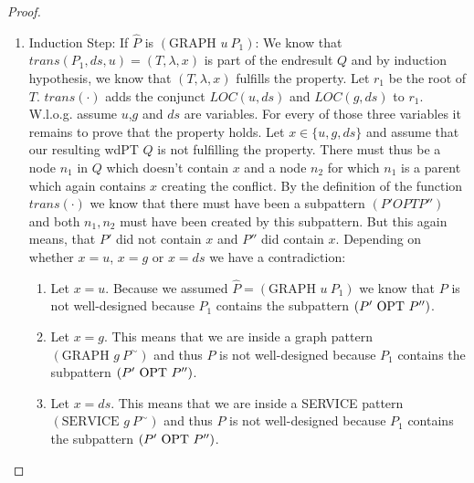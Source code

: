 \begin{proof}
\begin{enumerate}
\begin{enumerate}
				\item Induction Step: If $\hat{P}$ is $(\mbox{GRAPH }  u \ P_1)$:
					We know that $trans(P_1,ds,u) = (T, \lambda,x)$ 
					is part of the endresult $Q$ and by induction hypothesis,
					we know that $(T, \lambda,x)$ fulfills the property. Let
					$r_1$ be the root of $T$. $trans(\cdot)$ adds the conjunct
					$LOC(u,ds)$ and $LOC(g,ds)$ to $r_1$. W.l.o.g. assume $u$,$g$
					and $ds$ are variables. For every of those three variables it
					remains to prove that the property holds.
					Let $x \in \{u,g,ds\}$ and assume that our resulting wdPT $Q$ is
					not fulfilling the property. There must thus be a node $n_1$ in $Q$ which
					doesn't contain $x$ and a node $n_2$ for which $n_1$ is a parent 
					which again contains $x$ creating the conflict.
					By the definition of the function $trans(\cdot)$ we know that
					there must have been a subpattern $(P' OPT P'')$ and both $n_1,n_2$ must
					have been created by this subpattern. But this again means, that
					$P'$ did not contain $x$ and $P''$ did contain $x$. 
					Depending on whether $x = u$, $x=g$ or $x=ds$ we have a
					contradiction:
					\begin{enumerate}
						\item Let $x=u$. Because we assumed $\hat{P}=
							(\mbox{GRAPH } u \ P_1)$ we know that
							$P$ is not well-designed because $P_1$ contains the
							subpattern $(P' \mbox{ OPT } P'')$.
						\item Let $x = g$. This means that we are inside a graph
							pattern $(\mbox{GRAPH } g \ P^\sim)$ and thus $P$ is
							not well-designed because $P_1$ contains the
							subpattern $(P' \mbox{ OPT } P'')$.
						\item Let $x = ds$. This means that we are inside a
							SERVICE	pattern\\ $(\mbox{SERVICE } g \ P^\sim)$ and thus $P$ is
							not well-designed because $P_1$ contains the
							subpattern $(P' \mbox{ OPT } P'')$.
					\end{enumerate}




\end{enumerate}
\end{enumerate}
\end{proof}
